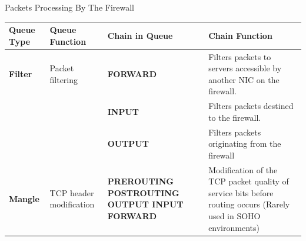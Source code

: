 \begin{frame}{Packets Processing By The Firewall}
\centering\fontsize{10.7}{13}\selectfont
\renewcommand{\arraystretch}{1.12}
\begin{tabular}{|Y{1.7cm}|Y{2.2cm}|Y{2.7cm}|Y{5.7cm}|}\hline
{}\color{white}\bfseries Queue Type&\color{white}\bfseries Queue Function&\color{white}\bfseries Chain in Queue&\color{white}\bfseries Chain Function\\\hline
\textcolor{CommandGreen}{\bfseries Filter}&Packet filtering&\textcolor{WarningColor}{\bfseries FORWARD}&Filters packets to servers accessible by another NIC on the firewall.\\
&&\textcolor{WarningColor}{\bfseries INPUT}&Filters packets destined to the firewall.\\
&&\textcolor{WarningColor}{\bfseries OUTPUT}&Filters packets originating from the firewall\\\hline
\textcolor{CommandGreen}{\bfseries Mangle}&TCP header modification&\textcolor{WarningColor}{\bfseries PREROUTING POSTROUTING OUTPUT INPUT FORWARD}&Modification of the TCP packet quality of service bits before routing occurs (Rarely used in SOHO environments)\\\hline
\end{tabular}
\end{frame}
